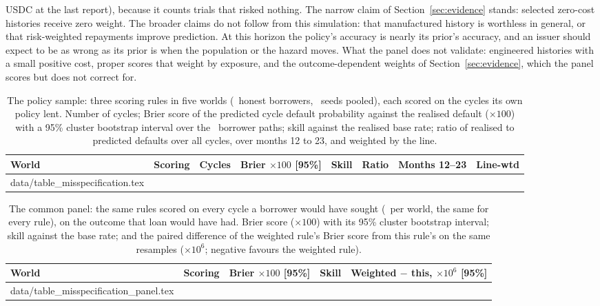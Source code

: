 \documentclass[preprint,11pt,authoryear]{elsarticle}
\makeatletter
\newcommand{\inputrows}[1]{\@@input #1 }
\makeatother
\begin{document}
USDC at the last report), because it counts trials that risked nothing. The narrow claim of
Section~\ref{sec:evidence} stands: selected zero-cost histories receive zero weight. The broader
claims do not follow from this simulation: that manufactured history is worthless in general, or
that risk-weighted repayments improve prediction. At this horizon the policy's accuracy is nearly
its prior's accuracy, and an issuer should expect to be as wrong as its prior is when the population
or the hazard moves. What the panel does not validate: engineered histories with a small positive
cost, proper scores that weight by exposure, and the outcome-dependent weights of
Section~\ref{sec:evidence}, which the panel scores but does not correct for.

\begin{table}[ht]
  \centering\small
  \caption{The policy sample: three scoring rules in five worlds (\MisspecHonest\ honest borrowers,
  \MisspecSeeds\ seeds pooled), each scored on the cycles its own policy lent. Number of cycles;
  Brier score of the predicted cycle default probability against the realised default ($\times100$)
  with a 95\% cluster bootstrap interval over the \MisspecClusters\ borrower paths; skill against the
  realised base rate; ratio of realised to predicted defaults over all cycles, over months 12 to 23,
  and weighted by the line.}
  \label{tab:misspec}
  \footnotesize\setlength{\tabcolsep}{3.5pt}
  \begin{tabular}{llrrrrrr}
    \toprule
    World & Scoring & Cycles & Brier $\times100$ [95\%] & Skill & Ratio & Months 12--23 & Line-wtd \\
    \midrule
    \inputrows{data/table_misspecification.tex}
    \bottomrule
  \end{tabular}
\end{table}

\begin{table}[ht]
  \centering\small
  \caption{The common panel: the same rules scored on every cycle a borrower would have sought
  (\PanelCyclesAssumed\ per world, the same for every rule), on the outcome that loan would have had.
  Brier score ($\times100$) with its 95\% cluster bootstrap interval; skill against the base rate;
  and the paired difference of the weighted rule's Brier score from this rule's on the same
  resamples ($\times10^{6}$; negative favours the weighted rule).}
  \label{tab:misspecpanel}
  \footnotesize\setlength{\tabcolsep}{4pt}
  \begin{tabular}{llrrr}
    \toprule
    World & Scoring & Brier $\times100$ [95\%] & Skill & Weighted $-$ this, $\times10^{6}$ [95\%] \\
    \midrule
    \inputrows{data/table_misspecification_panel.tex}
    \bottomrule
  \end{tabular}
\end{table}
\end{document}

